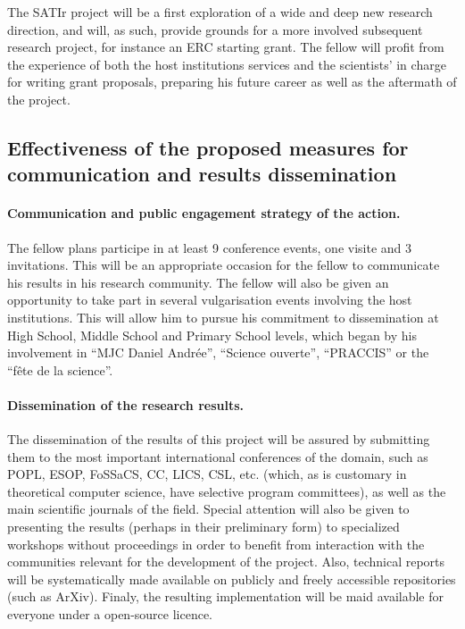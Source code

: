 \documentclass{article}[11pt]
\begin{document}
The SATIr project will be a first exploration of a wide and deep new research direction, and will, as such, provide grounds for a more involved subsequent research project, for instance an ERC starting grant. The fellow will profit from the experience of both the host institutions services and the scientists’ in charge for writing grant proposals, preparing his future career as well as the aftermath of the project.




\subsection{Effectiveness of the proposed measures for communication and results dissemination}

\paragraph{Communication and public engagement strategy of the action.} 
The fellow plans participe in at least 9 conference events, one visite and 3 invitations. This will be an appropriate occasion for the fellow to communicate his results in his research community. The fellow will also be given an opportunity to take part in several vulgarisation events involving the host institutions. This will allow him to pursue his commitment to dissemination at High School, Middle School and Primary School levels, which began by his involvement in “MJC Daniel Andrée”, ``Science ouverte'', ``PRACCIS'' or the “fête de la science”.


\paragraph{Dissemination of the research results.} 
The dissemination of the results of this project will be assured by submitting them to the most important international conferences of the domain, such as POPL, ESOP, FoSSaCS, CC, LICS, CSL, etc. (which, as is customary in theoretical computer science, have selective program committees), as well as the main scientific journals of the field. Special attention will also be given to presenting the results (perhaps in their preliminary form) to specialized workshops without proceedings in order to benefit from interaction with the communities relevant for the development of the project. Also, technical reports will be systematically made available on publicly and freely accessible repositories (such as ArXiv). Finaly, the resulting implementation will be maid available for everyone under a open-source licence.
\end{document}
